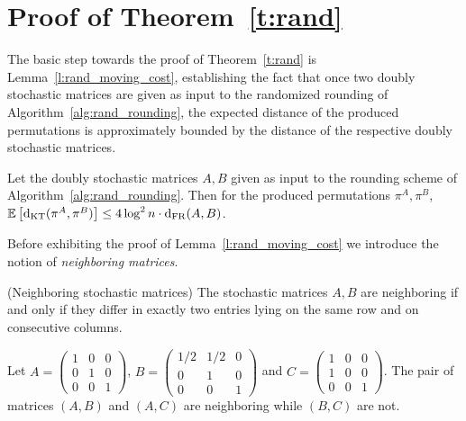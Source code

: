 \section{Proof of Theorem~\ref{t:rand}}\label{s:rand}
The basic step towards the proof of Theorem~\ref{t:rand} is Lemma~\ref{l:rand_moving_cost}, establishing the fact that once two doubly stochastic matrices are given as input to the randomized rounding of Algorithm~\ref{alg:rand_rounding}, the expected distance of the produced permutations is approximately bounded by the distance of the respective doubly stochastic matrices.
\begin{lemma}\label{l:rand_moving_cost}
Let the doubly stochastic matrices $A,B$ given as input to the
rounding scheme of
Algorithm~\ref{alg:rand_rounding}. Then for the produced permutations
$\pi^A,\pi^B$, 
$
\mathbb{E}\left[ \mathrm{d}_{\mathrm{KT}}(\pi^A,\pi^B) \right] \leq 4\log^2 n \cdot \mathrm{d}_{\mathrm{FR}}(A,B)$.
\end{lemma}

\noindent Before exhibiting the proof of Lemma~\ref{l:rand_moving_cost} we introduce the notion of \textit{neighboring matrices}.
\begin{definition}(Neighboring stochastic matrices)
The stochastic matrices $A,B$ are neighboring if and only if they differ in exactly two entries lying on the same row and on consecutive columns.
\end{definition}
\begin{example}
Let $A = 
\begin{pmatrix}
1 & 0 & 0 \\
0 & 1 & 0 \\
0 & 0 & 1
\end{pmatrix}$, $B = 
\begin{pmatrix}
1/2 & 1/2 & 0 \\
0 & 1 & 0 \\
0 & 0 & 1
\end{pmatrix}$ and $C = 
\begin{pmatrix}
1 & 0 & 0 \\
1 & 0 & 0 \\
0 & 0 & 1
\end{pmatrix}$. The pair of matrices
$(A,B)$ and $(A,C)$ are neighboring while $(B,C)$ are not.
\end{example}

